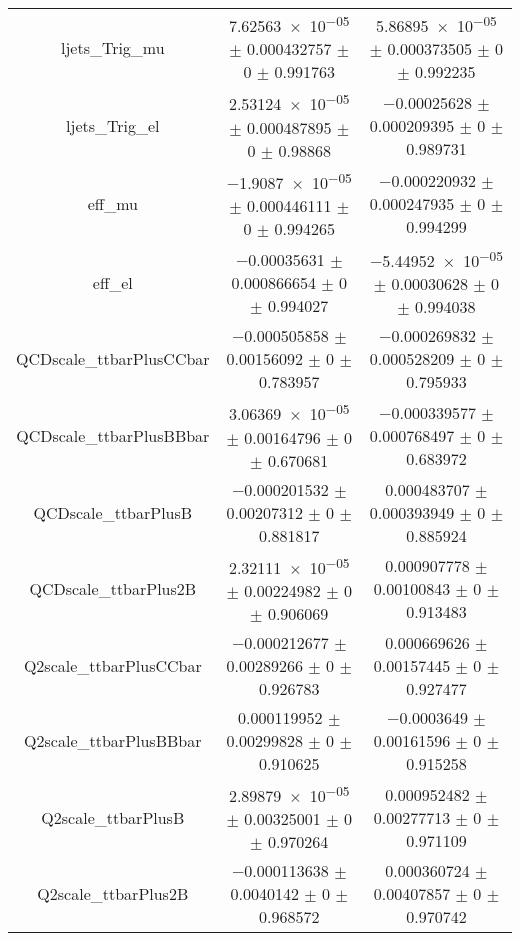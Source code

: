 \begin{table}
\begin{tabular}{ccc}
ljets\_Trig\_mu & \num{7.62563e-05} $\pm$ \num{0.000432757} $\pm$ \num{0} $\pm$ \num{0.991763} & \num{5.86895e-05} $\pm$ \num{0.000373505} $\pm$ \num{0} $\pm$ \num{0.992235}\\
ljets\_Trig\_el & \num{2.53124e-05} $\pm$ \num{0.000487895} $\pm$ \num{0} $\pm$ \num{0.98868} & \num{-0.00025628} $\pm$ \num{0.000209395} $\pm$ \num{0} $\pm$ \num{0.989731}\\
eff\_mu & \num{-1.9087e-05} $\pm$ \num{0.000446111} $\pm$ \num{0} $\pm$ \num{0.994265} & \num{-0.000220932} $\pm$ \num{0.000247935} $\pm$ \num{0} $\pm$ \num{0.994299}\\
eff\_el & \num{-0.00035631} $\pm$ \num{0.000866654} $\pm$ \num{0} $\pm$ \num{0.994027} & \num{-5.44952e-05} $\pm$ \num{0.00030628} $\pm$ \num{0} $\pm$ \num{0.994038}\\
QCDscale\_ttbarPlusCCbar & \num{-0.000505858} $\pm$ \num{0.00156092} $\pm$ \num{0} $\pm$ \num{0.783957} & \num{-0.000269832} $\pm$ \num{0.000528209} $\pm$ \num{0} $\pm$ \num{0.795933}\\
QCDscale\_ttbarPlusBBbar & \num{3.06369e-05} $\pm$ \num{0.00164796} $\pm$ \num{0} $\pm$ \num{0.670681} & \num{-0.000339577} $\pm$ \num{0.000768497} $\pm$ \num{0} $\pm$ \num{0.683972}\\
QCDscale\_ttbarPlusB & \num{-0.000201532} $\pm$ \num{0.00207312} $\pm$ \num{0} $\pm$ \num{0.881817} & \num{0.000483707} $\pm$ \num{0.000393949} $\pm$ \num{0} $\pm$ \num{0.885924}\\
QCDscale\_ttbarPlus2B & \num{2.32111e-05} $\pm$ \num{0.00224982} $\pm$ \num{0} $\pm$ \num{0.906069} & \num{0.000907778} $\pm$ \num{0.00100843} $\pm$ \num{0} $\pm$ \num{0.913483}\\
Q2scale\_ttbarPlusCCbar & \num{-0.000212677} $\pm$ \num{0.00289266} $\pm$ \num{0} $\pm$ \num{0.926783} & \num{0.000669626} $\pm$ \num{0.00157445} $\pm$ \num{0} $\pm$ \num{0.927477}\\
Q2scale\_ttbarPlusBBbar & \num{0.000119952} $\pm$ \num{0.00299828} $\pm$ \num{0} $\pm$ \num{0.910625} & \num{-0.0003649} $\pm$ \num{0.00161596} $\pm$ \num{0} $\pm$ \num{0.915258}\\
Q2scale\_ttbarPlusB & \num{2.89879e-05} $\pm$ \num{0.00325001} $\pm$ \num{0} $\pm$ \num{0.970264} & \num{0.000952482} $\pm$ \num{0.00277713} $\pm$ \num{0} $\pm$ \num{0.971109}\\
Q2scale\_ttbarPlus2B & \num{-0.000113638} $\pm$ \num{0.0040142} $\pm$ \num{0} $\pm$ \num{0.968572} & \num{0.000360724} $\pm$ \num{0.00407857} $\pm$ \num{0} $\pm$ \num{0.970742}\\

\end{tabular}
\end{table}
